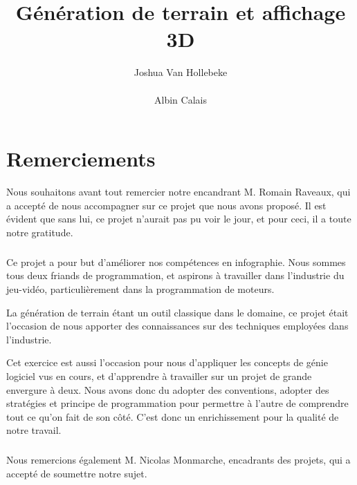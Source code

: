 \documentclass{EPUProjetDi}
\title{Génération de terrain et affichage 3D}
\author{
	Joshua Van Hollebeke\\
	\noindent[\url{joshua.van-hollebeke@etu.univ-tours.fr}]\\
	Albin Calais\\
	\noindent[\url{albin.calais@etu.univ-tours.fr}]
}
\begin{document}
\maketitle

\setcounter{page}{0}

{
\setlength{\parskip}{0em}
\tableofcontents
\listoffigures
}

\start



\chapter*{Remerciements} 

Nous souhaitons avant tout remercier notre encandrant M. Romain Raveaux, qui a accepté de nous accompagner sur ce projet que nous avons proposé.
Il est évident que sans lui, ce projet n'aurait pas pu voir le jour, et pour ceci, il a toute notre gratitude.

\paragraph{}

Ce projet a pour but d'améliorer nos compétences en infographie. Nous sommes tous deux friands de programmation, et aspirons à travailler dans l'industrie du jeu-vidéo, particulièrement dans la programmation de moteurs.

La génération de terrain étant un outil classique dans le domaine, ce projet était l'occasion de nous apporter des connaissances sur des techniques employées dans l'industrie. 

Cet exercice est aussi l'occasion pour nous d'appliquer les concepts de génie logiciel vus en cours, et d'apprendre à travailler sur un projet de grande envergure à deux.
Nous avons donc du adopter des conventions, adopter des stratégies et principe de programmation pour permettre à l'autre de comprendre tout ce qu'on fait de son côté. C'est donc un enrichissement pour la qualité de notre travail. 

\paragraph{}

Nous remercions également M. Nicolas Monmarche, encadrants des projets, qui a accepté de soumettre notre sujet.
\end{document}
